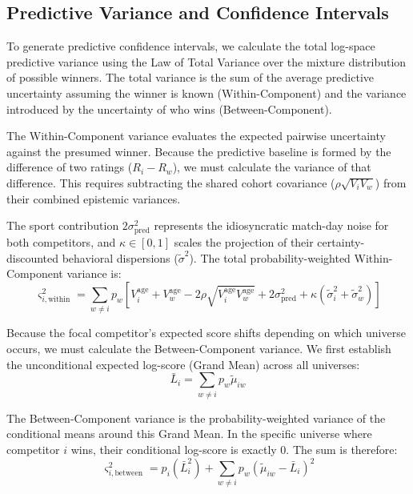 \documentclass[12pt]{article}
\begin{document}
	\subsection{Predictive Variance and Confidence Intervals}
	To generate predictive confidence intervals, we calculate the total log-space predictive variance using the Law of Total Variance over the mixture distribution of possible winners. The total variance is the sum of the average predictive uncertainty assuming the winner is known (Within-Component) and the variance introduced by the uncertainty of who wins (Between-Component).

	The Within-Component variance evaluates the expected pairwise uncertainty against the presumed winner. Because the predictive baseline is formed by the difference of two ratings ($R_i - R_w$), we must calculate the variance of that difference. This requires subtracting the shared cohort covariance ($\rho \sqrt{V_i V_w}$) from their combined epistemic variances.

	The sport contribution $2\sigma_{\mathrm{pred}}^2$ represents the idiosyncratic match-day noise for both competitors, and $\kappa \in [0,1]$ scales the projection of their certainty-discounted behavioral dispersions ($\tilde{\sigma}^2$). The total probability-weighted Within-Component variance is:
	\begin{equation}
		\varsigma_{i,\mathrm{within}}^2 = \sum_{w \neq i} p_w \left[ V_i^{\mathrm{age}} + V_w^{\mathrm{age}} - 2\rho\sqrt{V_i^{\mathrm{age}} V_w^{\mathrm{age}}} + 2\sigma_{\mathrm{pred}}^2 + \kappa(\tilde{\sigma}_i^2 + \tilde{\sigma}_w^2) \right]
	\end{equation}

	Because the focal competitor's expected score shifts depending on which universe occurs, we must calculate the Between-Component variance. We first establish the unconditional expected log-score (Grand Mean) across all universes:
	\begin{equation}
		\bar{L}_i = \sum_{w \neq i} p_w \tilde{\mu}_{iw}
	\end{equation}

	The Between-Component variance is the probability-weighted variance of the conditional means around this Grand Mean. In the specific universe where competitor $i$ wins, their conditional log-score is exactly $0$. The sum is therefore:
	\begin{equation}
		\varsigma_{i,\mathrm{between}}^2 = p_i (\bar{L}_i^2) + \sum_{w \neq i} p_w (\tilde{\mu}_{iw} - \bar{L}_i)^2
	\end{equation}
\end{document}
